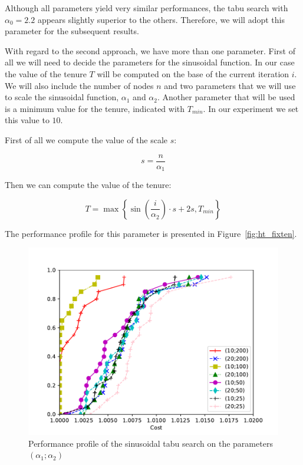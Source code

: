 \documentclass{article}
\begin{document}
Although all parameters yield very similar performances, the tabu search with $\alpha_0 = 2.2$
appears slightly superior to the others. Therefore, we will adopt this parameter for the subsequent results.

\clearpage

With regard to the second approach, we have more than one parameter. First of
all we will need to decide the parameters for the sinusoidal function. In our
case the value of the tenure $T$ will be computed on the base of the current
iteration $i$. We will also include the number of nodes $n$ and two parameters
that we will use to scale the sinusoidal function, $\alpha_1$ and $\alpha_2$.
Another parameter that will be used is a minimum value for the tenure,
indicated with $T_{min}$. In our experiment we set this value to $10$.

First of all we compute the value of the scale $s$:

\begin{equation*}
        s = \frac{n}{\alpha_1}
\end{equation*}

Then we can compute the value of the tenure:

\begin{equation*}
        T = \max \left\{
                \sin \left( \frac{i}{\alpha_2} \right) \cdot s + 2 s ,
                T_{min}
        \right\}
\end{equation*}

The performance profile for this parameter is presented in Figure~\ref{fig:ht_fixten}.

\begin{figure}[ht]
        \caption{Performance profile of the sinusoidal tabu search on the parameters $\left(\alpha_1; \alpha_2\right)$}
        \label{fig:ht_sinten}
        \centering
        \includegraphics[width=340pt]{assets/ht_sinten.pdf}
\end{figure}
\end{document}
